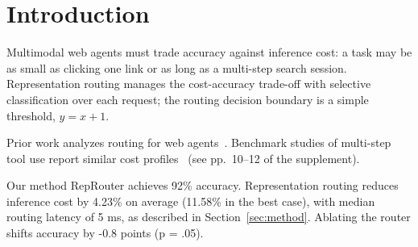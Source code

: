 \newcommand{\method}{RepRouter}

\section{Introduction}\label{sec:intro}

Multimodal web agents must trade accuracy against inference cost: a task may
be as small as clicking one link or as long as a multi-step search session.
Representation routing manages the cost-accuracy trade-off with selective
classification over each request; the routing decision boundary is a simple
threshold, $y = x + 1$.

Prior work analyzes routing for web agents~\cite{wang2025routing}.
Benchmark studies of multi-step tool use report similar cost
profiles~\cite{chen2024agents} (see pp.~10--12 of the supplement).

Our method \method{} achieves 92\% accuracy. Representation routing reduces
inference cost by 4.23\% on average (11.58\% in the best case), with median
routing latency of 5 ms, as described in Section~\ref{sec:method}. Ablating
the router shifts accuracy by -0.8 points (p = .05).
